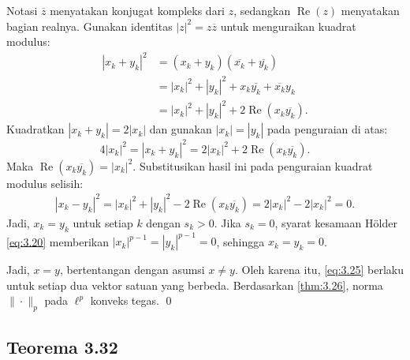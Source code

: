 \documentclass[aspectratio=169,11pt]{beamer}
\theoremstyle{definition}
\newcommand{\myref}[1]{\hyperref[#1]{\nameCref{#1} \ref*{#1}}}
\begin{document}
\begin{frame}[allowframebreaks]{\insertsection}{\insertsubsection}
\begin{enumerate}
          Notasi $\overline{z}$ menyatakan konjugat kompleks dari $z$, sedangkan $\operatorname{Re}(z)$ menyatakan bagian realnya. Gunakan identitas $|z|^2=z\overline{z}$ untuk menguraikan kuadrat modulus:
          \begin{align*}
            |x_k+y_k|^2
             & =(x_k+y_k)(\overline{x_k}+\overline{y_k})               \\
             & =|x_k|^2+|y_k|^2+x_k\overline{y_k}+\overline{x_k}y_k    \\
             & =|x_k|^2+|y_k|^2+2\operatorname{Re}(x_k\overline{y_k}).
          \end{align*}
          Kuadratkan $|x_k+y_k|=2|x_k|$ dan gunakan $|x_k|=|y_k|$ pada penguraian di atas:
          \begin{equation*}
            4|x_k|^2=|x_k+y_k|^2
            =2|x_k|^2+2\operatorname{Re}(x_k\overline{y_k}).
          \end{equation*}
          Maka $\operatorname{Re}(x_k\overline{y_k})=|x_k|^2$. Substitusikan hasil ini pada penguraian kuadrat modulus selisih:
          \begin{align*}
            |x_k-y_k|^2=|x_k|^2+|y_k|^2-2\operatorname{Re}(x_k\overline{y_k}) =2|x_k|^2-2|x_k|^2=0.
          \end{align*}
          Jadi, $x_k=y_k$ untuk setiap $k$ dengan $s_k>0$. Jika $s_k=0$, syarat kesamaan H\"older \eqref{eq:3.20} memberikan $|x_k|^{p-1}=|y_k|^{p-1}=0$, sehingga $x_k=y_k=0$.
  \end{enumerate}

  Jadi, $x=y$, bertentangan dengan asumsi $x\neq y$. Oleh karena itu, \eqref{eq:3.25} berlaku untuk setiap dua vektor satuan yang berbeda. Berdasarkan \myref{thm:3.26}, norma $\|\cdot\|_p$ pada $\ell^p$ konveks tegas. \qed
\end{frame}

\subsection{Teorema 3.32}
\end{document}
